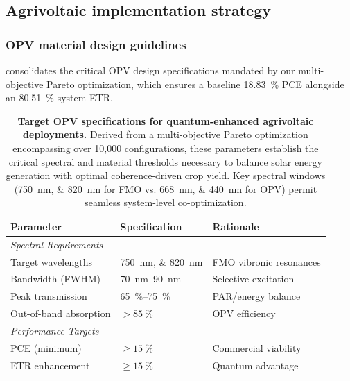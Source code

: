 \subsection{Agrivoltaic implementation strategy}

\subsubsection{OPV material design guidelines}

 consolidates the critical OPV design specifications mandated by our multi-objective Pareto optimization, which ensures a baseline \SI{18.83}{\percent} PCE alongside an \SI{80.51}{\percent} system ETR.

\begin{table}[ht]
\centering
\caption{\textbf{Target OPV specifications for quantum-enhanced agrivoltaic deployments.} Derived from a multi-objective Pareto optimization encompassing over 10,000 configurations, these parameters establish the critical spectral and material thresholds necessary to balance solar energy generation with optimal coherence-driven crop yield. Key spectral windows (\SIlist{750;820}{\nano\meter} for FMO vs. \SIlist{668;440}{\nano\meter} for OPV) permit seamless system-level co-optimization.}
\label{tab:opv_specs}
\begin{tabular}{lll}
	\toprule
	\textbf{Parameter}           & \textbf{Specification}                 & \textbf{Rationale}      \\ \midrule
	\multicolumn{3}{l}{\textit{Spectral Requirements}}                                              \\
	\quad Target wavelengths     & \SIlist{750;820}{\nano\meter}          & FMO vibronic resonances \\
	\quad Bandwidth (FWHM)       & \SIrange{70}{90}{\nano\meter}          & Selective excitation    \\
	\quad Peak transmission      & \SIrange{65}{75}{\percent}             & PAR/energy balance      \\
	\quad Out-of-band absorption & $> \SI{85}{\percent}$                  & OPV efficiency          \\[0.5em]
	\multicolumn{3}{l}{\textit{Performance Targets}}                                                \\
	\quad PCE (minimum)          & $\geq \SI{15}{\percent}$               & Commercial viability    \\
	\quad ETR enhancement        & $\geq \SI{15}{\percent}$               & Quantum advantage       \\

\end{tabular}
\end{table}
